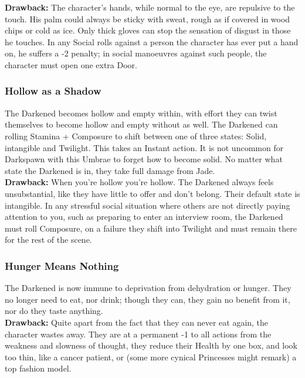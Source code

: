 \noindent  \textbf{Drawback:} The character’s hands, while normal to the eye, are repulsive to the touch. His palm could always be sticky with sweat, rough as if covered in wood chips or cold as ice. Only thick gloves can stop the sensation of disgust in those he touches. In any Social rolls against a person the character has ever put a hand on, he suffers a -2 penalty; in social manoeuvres against such people, the character must open one extra Door.


\subsubsection*{Hollow as a Shadow}
The Darkened becomes hollow and empty within, with effort they can twist themselves to become hollow and empty without as well. The Darkened can rolling Stamina + Composure to shift between one of three states: Solid, intangible and Twilight. This takes an Instant action. It is not uncommon for Darkspawn with this Umbrae to forget how to become solid. No matter what state the Darkened is in, they take full damage from Jade. \\

\noindent \textbf{Drawback:} When you're hollow you're hollow. The Darkened always feels unsubstantial, like they have little to offer and don't belong. Their default state is intangible. In any stressful social situation where others are not directly paying attention to you, such as preparing to enter an interview room, the Darkened must roll Composure, on a failure they shift into Twilight and must remain there for the rest of the scene. 
\subsubsection*{Hunger Means Nothing}
The Darkened is now immune to deprivation from dehydration or hunger. They no longer need to eat, nor drink; though they can, they gain no benefit from it, nor do they taste anything. \\

\noindent  \textbf{Drawback:} Quite apart from the fact that they can never eat again, the character wastes away. They are at a permanent -1 to all actions from the weakness and slowness of thought, they reduce their Health by one box, and look too thin, like a cancer patient, or (some more cynical Princesses might remark) a top fashion model. 

